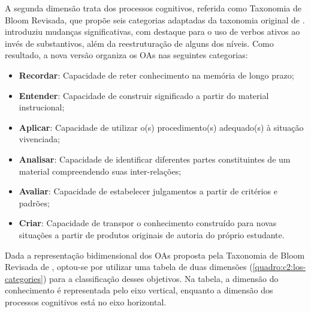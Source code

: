 A segunda dimensão trata dos processos cognitivos, referida como Taxonomia de Bloom Revisada, que propõe seis categorias adaptadas da taxonomia original de .  introduziu mudanças significativas, com destaque para o uso de verbos ativos ao invés de substantivos, além da reestruturação de alguns dos níveis. Como resultado, a nova versão organiza os OAs nas seguintes categorias:

\begin{itemize}
    \item \textbf{Recordar}: Capacidade de reter conhecimento na memória de longo prazo;
    \item \textbf{Entender}: Capacidade de construir significado a partir do material instrucional;
    \item \textbf{Aplicar}: Capacidade de utilizar o(s) procedimento(s) adequado(s) à situação vivenciada;
    \item \textbf{Analisar}: Capacidade de identificar diferentes partes constituintes de um material compreendendo suas inter-relações;
    \item \textbf{Avaliar}: Capacidade de estabelecer julgamentos a partir de critérios e padrões;
    \item \textbf{Criar}: Capacidade de transpor o conhecimento construído para novas situações a partir de produtos originais de autoria do próprio estudante.
\end{itemize}

Dada a representação bidimensional dos OAs proposta pela Taxonomia de Bloom Revisada de , optou-se por utilizar uma tabela de duas dimensões (\autoref{quadro:c2:los-categories}) para a classificação desses objetivos. Na tabela, a dimensão do conhecimento é representada pelo eixo vertical, enquanto a dimensão dos processos cognitivos está no eixo horizontal. 

\begin{quadro}[htbp]
\centering
{}
\end{quadro}

